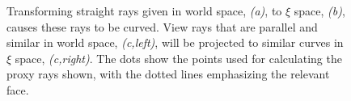\documentclass[journal]{vgtc}                %
\begin{document}
\begin{figure}[t]
    \centering
    \caption{Transforming straight rays given in world space, {\it (a)}, to $\xi$ space, {\it (b)}, causes these rays to be curved. View rays that are parallel and similar in world space, {\it (c,left)}, will be projected to similar curves in $\xi$ space, {\it(c,right)}. The dots show the points used for calculating the proxy rays shown, with the dotted lines emphasizing the relevant face.}
    \label{fig:raycoords}
\end{figure}
\end{document}
